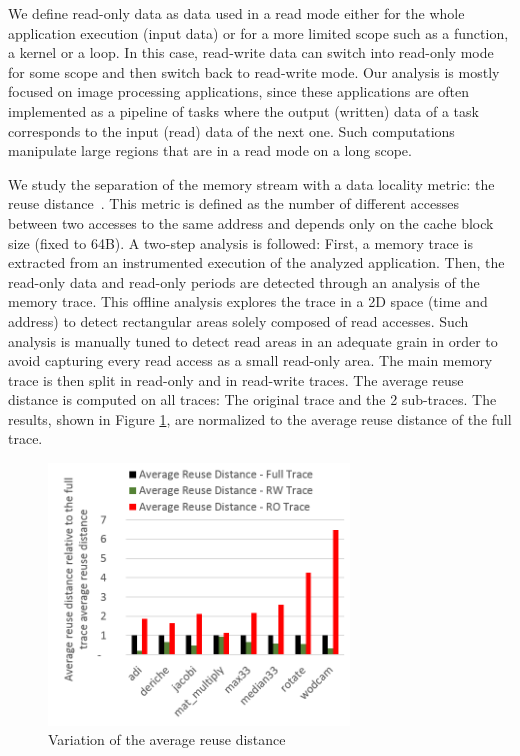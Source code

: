 \documentclass[sigconf]{acmart}
\begin{document}
We define read-only data as data used in a read mode either for the whole application execution (input data) or for a more limited scope such as a function, a kernel or a loop. In this case, read-write data can switch into read-only mode for some scope and then switch back to read-write mode. Our analysis is mostly focused on image processing applications, since these applications are often implemented as a pipeline of tasks where the output (written) data of a task corresponds to the input (read) data of the next one. Such computations manipulate large regions that are in a read mode on a long scope.

We study the separation of the memory stream with a data locality metric: the reuse distance~\cite{Coffman:1973}. This metric is defined as the number of different accesses between two accesses to the same address and depends only on the cache block size (fixed to 64B). A two-step analysis is followed: First, a memory trace is extracted from an instrumented execution of the analyzed application. Then, the read-only data and read-only periods are detected through an analysis of the memory trace. This offline analysis explores the trace in a 2D space (time and address) to detect rectangular areas solely composed of read accesses. Such analysis is manually tuned to detect read areas in an adequate grain in order to avoid capturing every read access as a small read-only area. The main memory trace is then split in read-only and in read-write traces. The average reuse distance is computed on all traces: The original trace and the 2 sub-traces. The results, shown in Figure \ref{stackdistance}, are normalized to the average reuse distance of the full trace.


\begin{figure}
    \centering
    \includegraphics[width=8cm]{./images/stackdistance.png}
     \caption{Variation of the average reuse distance}
    \label{stackdistance}
\end{figure}
\end{document}
